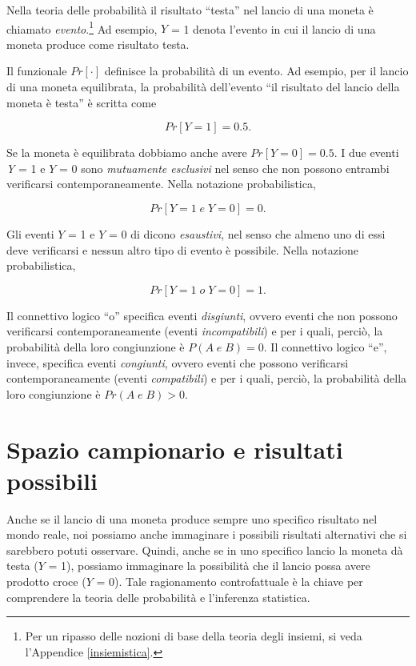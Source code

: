 \documentclass[
  11pt,
]{krantz}
\theoremstyle{definition}
\theoremstyle{definition}
\theoremstyle{definition}
\theoremstyle{definition}
\theoremstyle{remark}
\begin{document}
Nella teoria delle probabilità il risultato ``testa'' nel lancio di una moneta è chiamato \emph{evento}.\footnote{Per un ripasso delle nozioni di base della teoria degli insiemi, si veda l'Appendice \ref{insiemistica}.} Ad esempio, \(Y\) = 1 denota l'evento in cui il lancio di una moneta produce come risultato testa.

Il funzionale \(Pr[·]\) definisce la probabilità di un evento. Ad esempio, per il lancio di una moneta equilibrata, la probabilità dell'evento ``il risultato del lancio della moneta è testa'' è scritta come

\[
Pr[Y = 1] = 0.5.
\]

Se la moneta è equilibrata dobbiamo anche avere \(Pr[Y = 0] = 0.5\). I due eventi \emph{Y} = 1 e \(Y\) = 0 sono \emph{mutuamente esclusivi} nel senso che non possono entrambi verificarsi contemporaneamente. Nella notazione probabilistica,

\[
Pr[Y = 1\; e \; Y = 0] = 0.
\]

Gli eventi \(Y\) = 1 e \(Y\) = 0 di dicono \emph{esaustivi}, nel senso che almeno uno di essi deve verificarsi e nessun altro tipo di evento è possibile. Nella notazione probabilistica,

\[
Pr[Y = 1\; o \; Y = 0] = 1.
\]

Il connettivo logico ``o'' specifica eventi \emph{disgiunti}, ovvero eventi che non possono verificarsi contemporaneamente (eventi \emph{incompatibili}) e per i quali, perciò, la probabilità della loro congiunzione è \(P(A \; e \; B) = 0\). Il connettivo logico ``e'', invece, specifica eventi \emph{congiunti}, ovvero eventi che possono verificarsi contemporaneamente (eventi \emph{compatibili}) e per i quali, perciò, la probabilità della loro congiunzione è \(Pr(A \; e \; B) > 0\).

\hypertarget{spazio-campionario-e-risultati-possibili}{%
\section{Spazio campionario e risultati possibili}\label{spazio-campionario-e-risultati-possibili}}

Anche se il lancio di una moneta produce sempre uno specifico risultato nel mondo reale, noi possiamo anche immaginare i possibili risultati alternativi che si sarebbero potuti osservare. Quindi, anche se in uno specifico lancio la moneta dà testa (\(Y\) = 1), possiamo immaginare la possibilità che il lancio possa avere prodotto croce (\(Y\) = 0). Tale ragionamento controfattuale è la chiave per comprendere la teoria delle probabilità e l'inferenza statistica.
\end{document}
